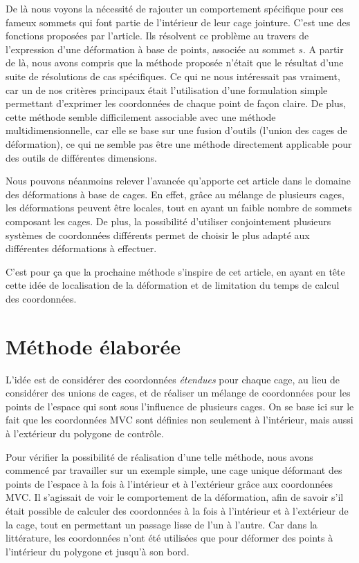 De là nous voyons la nécessité de rajouter un comportement spécifique
pour ces fameux sommets qui font partie de l'intérieur de leur cage
jointure. C'est une des fonctions proposées par l'article. Ils
résolvent ce problème au travers de l'expression d'une déformation à
base de points, associée au sommet $s$. A partir de là, nous avons
compris que la méthode proposée \cite{GPCP13} n'était que le résultat
d'une suite de résolutions de cas spécifiques. Ce qui ne nous
intéressait pas vraiment, car un de nos critères principaux était
l'utilisation d'une formulation simple permettant d'exprimer les
coordonnées de chaque point de façon claire. De plus, cette méthode
semble difficilement associable avec une méthode multidimensionnelle,
car elle se base sur une fusion d'outils (l'union des cages de
déformation), ce qui ne semble pas être une méthode directement
applicable pour des outils de différentes dimensions.

Nous pouvons néanmoins relever l'avancée qu'apporte cet article dans
le domaine des déformations à base de cages. En effet, grâce au
mélange de plusieurs cages, les déformations peuvent être locales,
tout en ayant un faible nombre de sommets composant les cages. De
plus, la possibilité d'utiliser conjointement plusieurs systèmes de
coordonnées différents permet de choisir le plus adapté aux
différentes déformations à effectuer.

C'est pour ça que la prochaine méthode s'inspire de cet article, en
ayant en tête cette idée de localisation de la déformation et de
limitation du temps de calcul des coordonnées.

\section{Méthode élaborée}
L'idée est de considérer des coordonnées \textit{étendues} pour chaque
cage, au lieu de considérer des unions de cages, et de réaliser un
mélange de coordonnées pour les points de l'espace qui sont sous
l'influence de plusieurs cages. On se base ici sur le fait que les
coordonnées MVC sont définies non seulement à l'intérieur, mais aussi
à l'extérieur du polygone de contrôle.

Pour vérifier la possibilité de réalisation d'une telle méthode, nous
avons commencé par travailler sur un exemple simple, une cage unique
déformant des points de l'espace à la fois à l'intérieur et à
l'extérieur grâce aux coordonnées MVC. Il s'agissait de voir le
comportement de la déformation, afin de savoir s'il était possible de
calculer des coordonnées à la fois à l'intérieur et à l'extérieur de
la cage, tout en permettant un passage lisse de l'un à l'autre. Car
dans la littérature, les coordonnées n'ont été utilisées que pour
déformer des points à l'intérieur du polygone et jusqu'à son bord.

